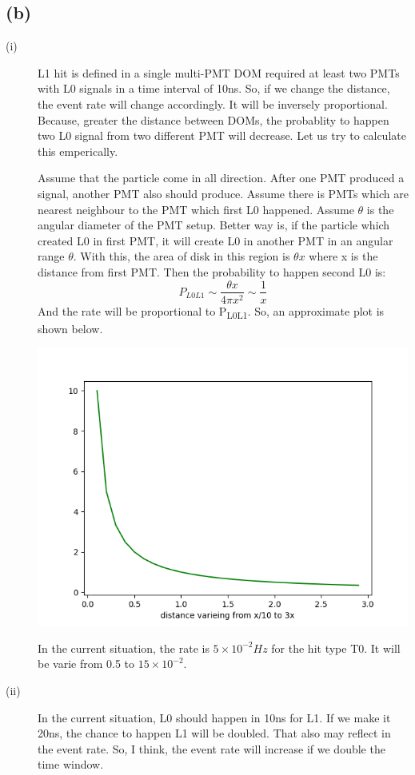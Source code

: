 \documentclass[a4paper,12pt]{article}
\begin{document}
\subsection*{(b)}
\label{sec:orgbb60ee6}
\begin{description}
\item[{(i)}] L1 hit is defined in a single multi-PMT DOM required at least two PMTs with L0 signals in a time interval of 10ns. So, if we change the distance, the event rate will change accordingly. It will be inversely proportional. Because, greater the distance between DOMs, the probablity to happen two L0 signal from two different PMT will decrease. Let us try to calculate this emperically.

Assume that the particle come in all direction. After one PMT produced a signal, another PMT also should produce. Assume there is PMTs which are nearest neighbour to the PMT which first L0 happened. Assume \(\theta\) is the angular diameter of the PMT setup. Better way is, if the particle which created L0 in first PMT, it will create L0 in another PMT in an angular range \(\theta\). With this, the area of disk in this region is \(\theta x\) where x is the distance from first PMT.
Then the probability to happen second L0 is:
$$P_{L0L1} \sim \frac{\theta x}{4\pi x^2} \sim \frac{1}{x} $$
And the rate will be proportional to P\textsubscript{L0L1}. So, an approximate plot is shown below.
\begin{center}
\includegraphics[width=.9\linewidth]{Pr2_plot.png}
\end{center}

In the current situation, the rate is \(5\times 10^{-2} Hz\) for the hit type T0. It will be varie from 0.5 to \(15\times 10^{-2}\).

\item[{(ii)}] In the current situation, L0 should happen in 10ns for L1. If we make it 20ns, the chance to happen L1 will be doubled. That also may reflect in the event rate. So, I think, the event rate will increase if we double the time window.
\end{description}
\end{document}
